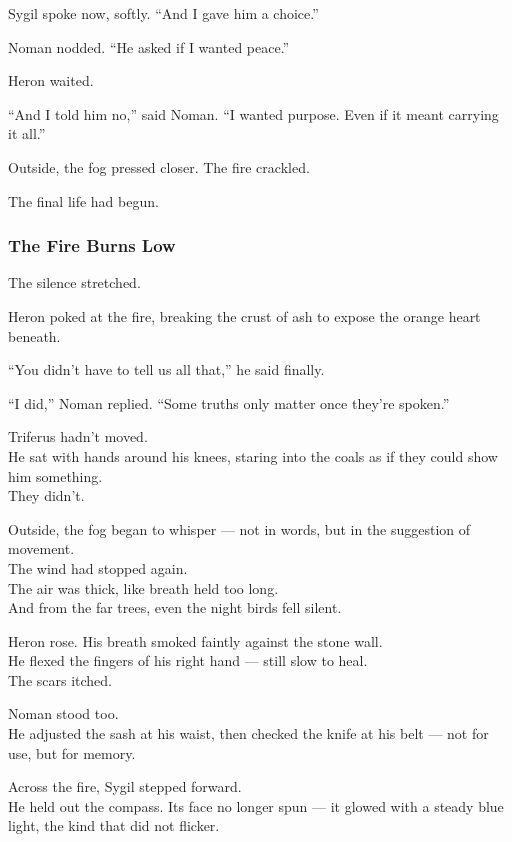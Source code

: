 \documentclass[12pt]{article}
\begin{document}
Sygil spoke now, softly. “And I gave him a choice.”

Noman nodded. “He asked if I wanted peace.”

Heron waited.

“And I told him no,” said Noman. “I wanted purpose. Even if it meant carrying it all.”

\vspace{1em}

Outside, the fog pressed closer. The fire crackled.

The final life had begun.

\dotfill

\subsubsection*{The Fire Burns Low}

The silence stretched.

Heron poked at the fire, breaking the crust of ash to expose the orange heart beneath.

“You didn’t have to tell us all that,” he said finally.

“I did,” Noman replied. “Some truths only matter once they’re spoken.”

\vspace{1em}

Triferus hadn’t moved.\\
He sat with hands around his knees, staring into the coals as if they could show him something.\\
They didn’t.

Outside, the fog began to whisper — not in words, but in the suggestion of movement.\\
The wind had stopped again.\\
The air was thick, like breath held too long.\\
And from the far trees, even the night birds fell silent.

Heron rose. His breath smoked faintly against the stone wall.\\
He flexed the fingers of his right hand — still slow to heal.\\
The scars itched.

Noman stood too.\\
He adjusted the sash at his waist, then checked the knife at his belt — not for use, but for memory.

Across the fire, Sygil stepped forward.\\
He held out the compass. Its face no longer spun — it glowed with a steady blue light, the kind that did not flicker.
\end{document}
